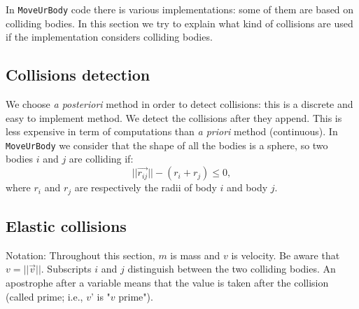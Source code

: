 In \texttt{MoveUrBody} code there is various implementations: some of them are based on colliding bodies.
In this section we try to explain what kind of collisions are used if the implementation considers colliding bodies.

\subsection{Collisions detection}
We choose \textit{a posteriori} method in order to detect collisions: this is a discrete and easy to implement method.
We detect the collisions after they append. 
This is less expensive in term of computations than \textit{a priori} method (continuous).
In \texttt{MoveUrBody} we consider that the shape of all the bodies is a sphere, so two bodies $i$ and $j$ are colliding if:
\begin{equation}	
\label{eq:collsDetection}
	||\vec{r_{ij}}|| - (r_i + r_j) \leq 0,
\end{equation}
where $r_i$ and $r_j$ are respectively the radii of body $i$ and body $j$.

\subsection{Elastic collisions}
Notation: Throughout this section, $m$ is mass and $v$ is velocity.
Be aware that $v = ||\vec{v}||$.
Subscripts $i$ and $j$ distinguish between the two colliding bodies. 
An apostrophe after a variable means that the value is taken after the collision (called prime; i.e., $v$' is "$v$ prime").\\


